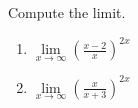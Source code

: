 Compute the limit. 
\begin{enumerate}
\item $\lim\limits_{x\to\infty} \left(\frac{x-2}{x}\right)^{2x}$ 
\item $\lim\limits_{x\to\infty} \left(\frac{x}{x+3}\right)^{2x}$ 
\end{enumerate}
